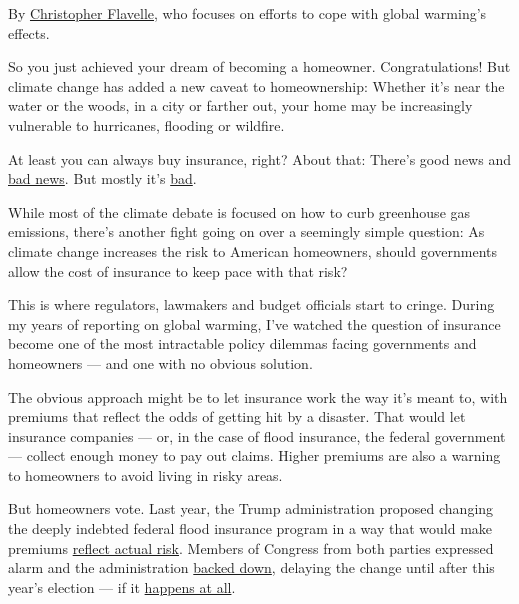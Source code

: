 By
\href{https://www.nytimes3xbfgragh.onion/by/christopher-flavelle}{Christopher
Flavelle}, who focuses on efforts to cope with global warming's effects.

So you just achieved your dream of becoming a homeowner.
Congratulations! But climate change has added a new caveat to
homeownership: Whether it's near the water or the woods, in a city or
farther out, your home may be increasingly vulnerable to hurricanes,
flooding or wildfire.

At least you can always buy insurance, right? About that: There's good
news and
\href{https://www.nytimes3xbfgragh.onion/2019/08/20/climate/fire-insurance-renewal.html}{bad
news}. But mostly it's
\href{https://www.nytimes3xbfgragh.onion/2019/08/20/climate/fire-insurance-renewal.html}{bad}.

While most of the climate debate is focused on how to curb greenhouse
gas emissions, there's another fight going on over a seemingly simple
question: As climate change increases the risk to American homeowners,
should governments allow the cost of insurance to keep pace with that
risk?

This is where regulators, lawmakers and budget officials start to
cringe. During my years of reporting on global warming, I've watched the
question of insurance become one of the most intractable policy dilemmas
facing governments and homeowners --- and one with no obvious solution.

The obvious approach might be to let insurance work the way it's meant
to, with premiums that reflect the odds of getting hit by a disaster.
That would let insurance companies --- or, in the case of flood
insurance, the federal government --- collect enough money to pay out
claims. Higher premiums are also a warning to homeowners to avoid living
in risky areas.

But homeowners vote. Last year, the Trump administration proposed
changing the deeply indebted federal flood insurance program in a way
that would make premiums
\href{https://www.bloomberg.com/news/articles/2019-03-12/insurance-rates-seen-rising-in-flood-prone-areas-with-trump-plan}{reflect
actual risk}. Members of Congress from both parties expressed alarm and
the administration
\href{https://www.fema.gov/news-release/2019/11/07/fema-defers-implementation-risk-rating-20}{backed
down}, delaying the change until after this year's election --- if it
\href{https://www.politico.com/news/2019/11/07/fema-postpones-flood-insurance-rate-revamp-amid-backlash-067505}{happens
at all}.

